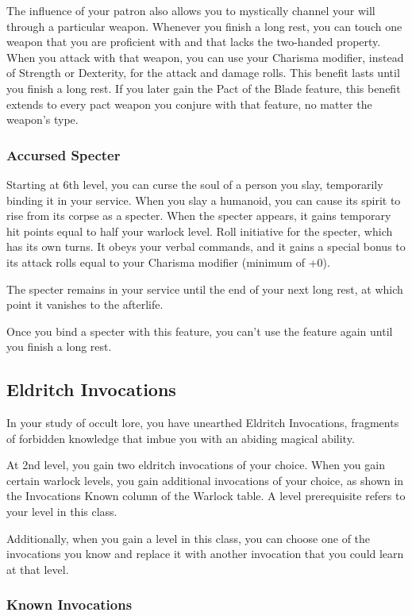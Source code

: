 {The influence of your patron also allows you to mystically channel your will through a particular weapon. Whenever you finish a long rest, you can touch one weapon that you are proficient with and that lacks the two-handed property. When you attack with that weapon, you can use your Charisma modifier, instead of Strength or Dexterity, for the attack and damage rolls. This benefit lasts until you finish a long rest. If you later gain the Pact of the Blade feature, this benefit extends to every pact weapon you conjure with that feature, no matter the weapon's type.
\subsubsection*{Accursed Specter}
Starting at 6th level, you can curse the soul of a person you slay, temporarily binding it in your service. When you slay a humanoid, you can cause its spirit to rise from its corpse as a specter. When the specter appears, it gains temporary hit points equal to half your warlock level. Roll initiative for the specter, which has its own turns. It obeys your verbal commands, and it gains a special bonus to its attack rolls equal to your Charisma modifier (minimum of +0).

The specter remains in your service until the end of your next long rest, at which point it vanishes to the afterlife.

Once you bind a specter with this feature, you can't use the feature again until you finish a long rest.

\subsection*{Eldritch Invocations}
In your study of occult lore, you have unearthed Eldritch Invocations, fragments of forbidden knowledge that imbue you with an abiding magical ability.

At 2nd level, you gain two eldritch invocations of your choice. When you gain certain warlock levels, you gain additional invocations of your choice, as shown in the Invocations Known column of the Warlock table. A level prerequisite refers to your level in this class.

Additionally, when you gain a level in this class, you can choose one of the invocations you know and replace it with another invocation that you could learn at that level.
\subsubsection*{Known Invocations}
}
